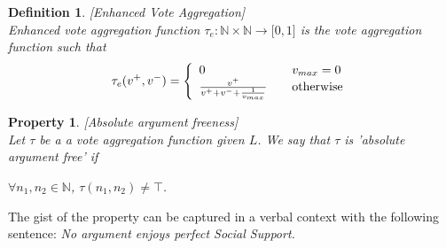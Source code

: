 \documentclass{article}
\newtheorem{definition}{Definition}
\newtheorem{property}{Property}
\newtheorem{proposition}{Proposition}
\newcommand{\nat}{\mathbb{N}}   %
\newcommand{\args}{\mathcal{A}} %
\newcommand{\valueset}{L}
\begin{document}
\begin{definition}
\label{def:enhVoteAgg}
[Enhanced Vote Aggregation]
\\ Enhanced vote aggregation function
$\tau_{e}:
\mathbb{N} \times \mathbb{N}
\rightarrow\lbrack0,1]$ is the vote aggregation function such that
\[
\tau_{e}  (v^{+},v^{-})  = \left\{
\begin{array}
[c]{lll}
0 &  & v_{max}=0\\
\frac{v^{+}}{v^{+}+v^{-}+\frac{1}{v_{max}}} &  & \text{otherwise}%
\end{array}
\right.
\]
\end{definition}

\begin{property}
\label{P1} [Absolute argument freeness] \\
Let $\tau$ be a a vote aggregation function given $\valueset$. We say that $\tau$ is 'absolute argument free' if
\begin{center}
$\forall n_1, n_2 \in \nat$, $\tau (n_1, n_2) \neq \top$. %
\end{center}
\end{property}

The gist of the property can be captured in a verbal context with the following sentence: \emph{No argument enjoys perfect Social Support.}  \\

\begin{comment}
\begin{proposition}
Enhanced Vote Aggregation function is absolute argument free.%
\end{proposition}


\begin{proof} Trivial.
\\
Suppose an arbitrary $a \in \args$ of an extended social argumentation framework $\mathcal{F}$ with some well-behaved semantics $\mathcal{S}$:\\
If $v^+ = 0$ then $\tau(a) = \tau(v^{+}, v^{-}, v_{max}) = 0 \le 1$. \\
Else if $v^+ \neq 0$, then $v_{max} \neq 0$ and since $v_{max} \in \mathcal{Z}^+$, then $\frac{1}{v_{max}} > 0.$ Since denominator equals to the addition of the numerator and some $r \in {R}^+ $, denominator is bigger than the numerator and thus \\
$ \frac{v^{+}}{v^{+}+v^{-}+\frac{1}{v_{max}}} = \tau(v^{+}, v^{-}, v_{max}) \le 1$.

\end{proof}
\end{comment}
\end{document}
